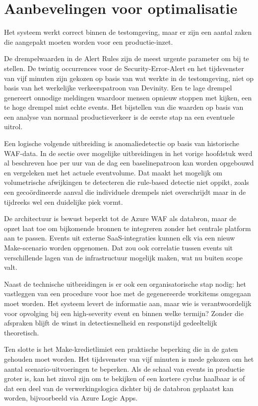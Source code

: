 
\section{Aanbevelingen voor optimalisatie}

Het systeem werkt correct binnen de testomgeving, maar er zijn een aantal zaken die aangepakt moeten worden voor een productie-inzet.

De drempelwaarden in de Alert Rules zijn de meest urgente parameter om bij te stellen. De twintig occurrences voor de Security-Error-Alert en het tijdsvenster van vijf minuten zijn gekozen op basis van wat werkte in de testomgeving, niet op basis van het werkelijke verkeerspatroon van Devinity. Een te lage drempel genereert onnodige meldingen waardoor mensen opnieuw stoppen met kijken, een te hoge drempel mist echte events. Het bijstellen van die waarden op basis van een analyse van normaal productieverkeer is de eerste stap na een eventuele uitrol.

Een logische volgende uitbreiding is anomaliedetectie op basis van historische WAF-data. In de sectie over mogelijke uitbreidingen in het vorige hoofdstuk werd al beschreven hoe per uur van de dag een baselinepatroon kan worden opgebouwd en vergeleken met het actuele eventvolume. Dat maakt het mogelijk om volumetrische afwijkingen te detecteren die rule-based detectie niet oppikt, zoals een gecoördineerde aanval die individuele drempels niet overschrijdt maar in de tijdreeks wel een duidelijke piek vormt.

De architectuur is bewust beperkt tot de Azure WAF als databron, maar de opzet laat toe om bijkomende bronnen te integreren zonder het centrale platform aan te passen. Events uit externe SaaS-integraties kunnen elk via een nieuw Make-scenario worden opgenomen. Dat zou ook correlatie tussen events uit verschillende lagen van de infrastructuur mogelijk maken, wat nu buiten scope valt.

Naast de technische uitbreidingen is er ook een organisatorische stap nodig: het vastleggen van een procedure voor hoe met de gegenereerde workitems omgegaan moet worden. Het systeem levert de informatie aan, maar wie is verantwoordelijk voor opvolging bij een high-severity event en binnen welke termijn? Zonder die afspraken blijft de winst in detectiesnelheid en responstijd gedeeltelijk theoretisch.

Ten slotte is het Make-kredietlimiet een praktische beperking die in de gaten gehouden moet worden. Het tijdsvenster van vijf minuten is mede gekozen om het aantal scenario-uitvoeringen te beperken. Als de schaal van events in productie groter is, kan het zinvol zijn om te bekijken of een kortere cyclus haalbaar is of dat een deel van de verwerkingslogica dichter bij de databron geplaatst kan worden, bijvoorbeeld via Azure Logic Apps.

